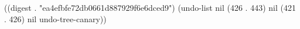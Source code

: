 
((digest . "ea4efbfe72db0661d887929f6e6dced9") (undo-list nil (426 . 443) nil (421 . 426) nil undo-tree-canary))
